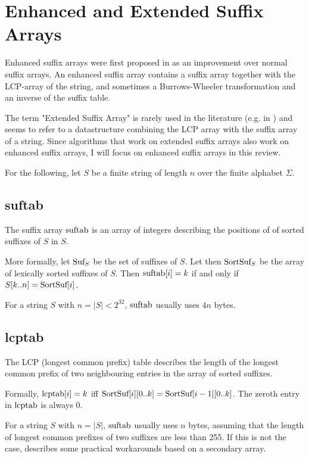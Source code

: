 \documentclass[a4paper,10pt]{article}
\begin{document}
\section*{Enhanced and Extended Suffix Arrays}

Enhanced suffix arrays were first proposed in
\citealt{abouelhoda2002enhanced} as an improvement over normal suffix
arrays. An enhanced suffix array contains a suffix array together with the
LCP-array of the string, and sometimes a Burrows-Wheeler transformation
and an inverse of the suffix table.

The term "Extended Suffix Array" is rarely used in the literature (e.g. in
\citealt{salson2010dynamic}) and seems to refer to a datastructure
combining the LCP array with the suffix array of a string. Since algorithms
that work on extended suffix arrays also work on enhanced suffix arrays,
I will focus on enhanced suffix arrays in this review.

For the following, let $S$ be a finite string of length $n$ over the
finite alphabet $\Sigma$.

\subsection*{suftab}

The suffix array $\hbox{suftab}$ is an array of integers describing the
positions of of sorted suffixes of $S$ in $S$.

More formally, let $\hbox{Suf}_{S}$ be the set of suffixes of $S$. Let
then $\hbox{SortSuf}_{S}$ be the array of lexically sorted suffixes of
$S$. Then $\hbox{suftab}[i]=k$ if and only if $S[k..n]=\hbox{SortSuf}[i]$.

For a string $S$ with $n=|S|<2^{32}$, $\hbox{suftab}$ usually uses $4n$
bytes.

\subsection*{lcptab}

The LCP (longest common prefix) table describes the length of the longest
common prefix of two neighbouring entries in the array of sorted suffixes.

Formally, $\hbox{lcptab}[i]=k$ iff
$\hbox{SortSuf}[i][0..k]=\hbox{SortSuf}[i-1][0..k]$. The zeroth entry
in $\hbox{lcptab}$ is always $0$.

For a string $S$ with $n=|S|$, $\hbox{suftab}$ usually uses $n$
bytes, assuming that the length of longest common prefixes
of two suffixes are less than 255. If this is not the case,
\citealt[sec. 8.1]{abouelhoda2004replacing} describes some practical
workarounds based on a secondary array.
\end{document}
